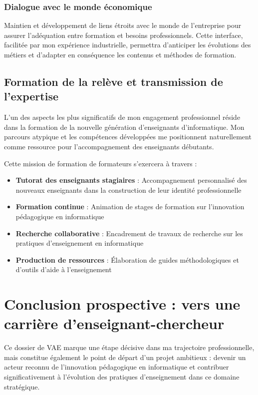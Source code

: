 \documentclass[12pt,a4paper]{report}
\begin{document}
\subsubsection*{Dialogue avec le monde économique}

Maintien et développement de liens étroits avec le monde de l'entreprise pour assurer l'adéquation entre formation et besoins professionnels. Cette interface, facilitée par mon expérience industrielle, permettra d'anticiper les évolutions des métiers et d'adapter en conséquence les contenus et méthodes de formation.

\subsection*{Formation de la relève et transmission de l'expertise}

L'un des aspects les plus significatifs de mon engagement professionnel réside dans la formation de la nouvelle génération d'enseignants d'informatique. Mon parcours atypique et les compétences développées me positionnent naturellement comme ressource pour l'accompagnement des enseignants débutants.

Cette mission de formation de formateurs s'exercera à travers :

\begin{itemize}[leftmargin=*]
    \item \textbf{Tutorat des enseignants stagiaires} : Accompagnement personnalisé des nouveaux enseignants dans la construction de leur identité professionnelle
    \item \textbf{Formation continue} : Animation de stages de formation sur l'innovation pédagogique en informatique
    \item \textbf{Recherche collaborative} : Encadrement de travaux de recherche sur les pratiques d'enseignement en informatique
    \item \textbf{Production de ressources} : Élaboration de guides méthodologiques et d'outils d'aide à l'enseignement
\end{itemize}

\section*{Conclusion prospective : vers une carrière d'enseignant-chercheur}

Ce dossier de VAE marque une étape décisive dans ma trajectoire professionnelle, mais constitue également le point de départ d'un projet ambitieux : devenir un acteur reconnu de l'innovation pédagogique en informatique et contribuer significativement à l'évolution des pratiques d'enseignement dans ce domaine stratégique.
\end{document}
